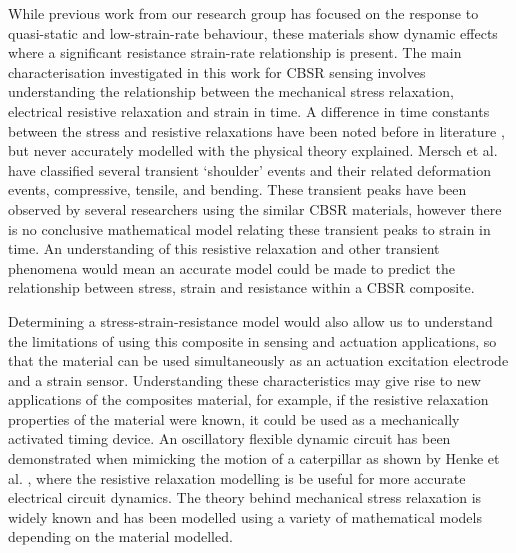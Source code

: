 While previous work from our research group \cite{Giffney2017,Devaraj2018} has focused on the response to quasi-static and low-strain-rate behaviour, these materials show dynamic effects where a significant resistance strain-rate relationship is present. The main characterisation investigated in this work for CBSR sensing involves understanding the relationship between the mechanical stress relaxation, electrical resistive relaxation and strain in time. A difference in time constants between the stress and resistive relaxations have been noted before in literature \cite{Kost1994,Wang2013,Maddipatla2017,Wang2004}, but never accurately modelled with the physical theory explained. Mersch et al. \cite{Mersch2020} have classified several transient `shoulder' events and their related deformation events, compressive, tensile, and bending. These transient peaks have been observed by several researchers using the similar CBSR materials, however there is no conclusive mathematical model relating these transient peaks to strain in time. An understanding of this resistive relaxation and other transient phenomena would mean an accurate model could be made to predict the relationship between stress, strain and resistance within a CBSR composite. 

Determining a stress-strain-resistance model would also allow us to understand the limitations of using this composite in sensing and actuation applications, so that the material can be used simultaneously as an actuation excitation electrode and a strain sensor. Understanding these characteristics may give rise to new applications of the composites material, for example, if the resistive relaxation properties of the material were known, it could be used as a mechanically activated timing device. An oscillatory flexible dynamic circuit has been demonstrated when mimicking the motion of a caterpillar as shown by Henke et al. \cite{Henke2018}, where the resistive relaxation modelling is be useful for more accurate electrical circuit dynamics. The theory behind mechanical stress relaxation is widely known and has been modelled using a variety of mathematical models \cite{Fung1993} depending on the material modelled. 

